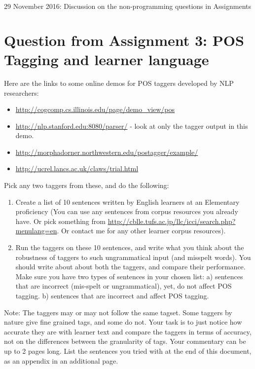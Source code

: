 \documentclass[11pt,a4paper]{article}
\begin{document}
\begin{center}
  29 November 2016: Discussion on the non-programming questions in Assignments
\end{center}


\section*{Question from Assignment 3: POS Tagging and learner language} 
Here are the links to some online demos for POS taggers developed by NLP researchers:
\begin{itemize}
\item \url{http://cogcomp.cs.illinois.edu/page/demo\_view/pos}
\item \url{http://nlp.stanford.edu:8080/parser/} - look at only the tagger output in this demo.
\item \url{http://morphadorner.northwestern.edu/postagger/example/}
\item \url{http://ucrel.lancs.ac.uk/claws/trial.html}
\end{itemize}
Pick any two taggers from these, and do the following:
\begin{enumerate}
\item Create a list of 10 sentences written by English learners at an Elementary proficiency (You can use any sentences from corpus resources you already have. Or pick something from \url{http://cblle.tufs.ac.jp/llc/icci/search.php?menulang=en}. Or contact me for any other learner corpus resources). 
\item Run the taggers on these 10 sentences, and write what you think about the robustness of taggers to such ungrammatical input (and misspelt words). You should write about about both the taggers, and compare their performance. Make sure you have two types of sentences in your chosen list: a) sentences that are incorrect (mis-spelt or ungrammatical), yet, do not affect POS tagging. b) sentences that are incorrect and affect POS tagging.
\end{enumerate}
Note: The taggers may or may not follow the same tagset. Some taggers by nature give fine grained tags, and some do not. Your task is to just notice how accurate they are with learner text and compare the taggers in terms of accuracy, not on the differences between the granularity of tags. Your commentary can be up to 2 pages long. List the sentences you tried with at the end of this document, as an appendix in an additional page. 
\end{document}
